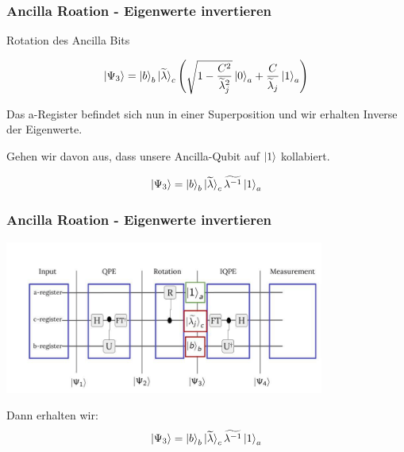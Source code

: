 \begin{frame}
    \frametitle{Ancilla Roation - Eigenwerte invertieren}       
    Rotation des Ancilla Bits

    $$\ket{\Psi_3} = \ket{b}_b \ket{\widetilde{\lambda}}_c \left( \sqrt{1-\frac{C^2}{\widetilde{\lambda}_j^2}} \ket{0}_a + \frac{C}{\widetilde{\lambda}_j} \ket{1}_a\right)$$

    Das a-Register befindet sich nun in einer Superposition und wir erhalten Inverse der Eigenwerte.

    \hfil

    Gehen wir davon aus, dass unsere Ancilla-Qubit auf $\ket{1}$ kollabiert.

    $$\ket{\Psi_3} = \ket{b}_b \ket{\widetilde{\lambda}}_c \widetilde{\lambda^{-1}} \ket{1}_a$$

\end{frame}


\begin{frame}
    \frametitle{Ancilla Roation - Eigenwerte invertieren}
    \begin{center}

    \includegraphics[width=10.5cm]{img/hhl_circuit/hhl_circuit_3.jpg}
    \end{center}

    Dann erhalten wir:
    $$\ket{\Psi_3} = \ket{b}_b \ket{\widetilde{\lambda}}_c \widetilde{\lambda^{-1}} \ket{1}_a$$


\end{frame}

